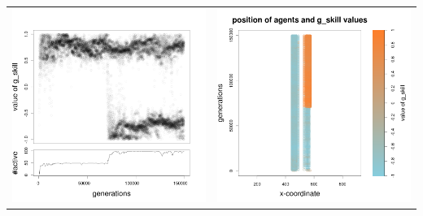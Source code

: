 \documentclass[a4paper,10pt]{article}
\begin{document}
\begin{table}[h!]
\begin{tabular}{cc}
 \newline
 \includegraphics[width=\imgSize]{images/5StaticEnv/Gplot40_staticEnv4}&\includegraphics[width=\imgSize]{images/5StaticEnv/Gplot40Static_staticEnv4}\\

\end{tabular}
\end{table}
\end{document}
